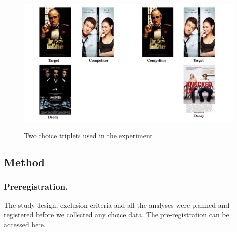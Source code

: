 \documentclass[12pt, a4paper]{article}
\begin{document}

\begin{figure}
\centering
\captionsetup{justification=centering}
		 \caption{Two choice triplets used in the experiment}
\includegraphics[width=1\textwidth]{figure1.pdf}
\label{fig:quadruplets}
\end{figure}

\subsection*{Method}

\subsubsection*{Preregistration.}
The study design, exclusion criteria and all the analyses were planned and registered before we collected any choice data. The pre-registration can be accessed \href{https://osf.io/fme6c/?view_only=31da4193689f4247a76af93b2f98fcef}{here}.
\end{document}
